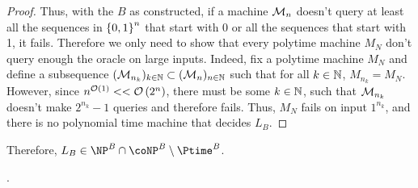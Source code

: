 \begin{proof}
        Thus, with the $B$ as constructed, if a machine $\mathcal{M}_n$ doesn't query 
        at least all the sequences in $\left\{ 0, 1 \right\}^n$ that start with 0
        or all the sequences that start with 1,
        it fails.
        Therefore we only need to show that every polytime machine $M_N$
        don't query enough the oracle on large inputs.
        Indeed, fix a polytime machine $M_N$
        and define a subsequence
        $(\mathcal{M}_{n_k})_{k \in \mathbb N} \subset (\mathcal{M}_n)_{n \in \mathbb N}$ 
        such that for all $k \in \mathbb N$, $M_{n_k} = M_N$.
        However, since $n^{\mathcal{O}\left(1\right)} << \mathcal{O}\left(2^n\right)$, there must be some $k \in \mathbb N$,
        such that $\mathcal{M}_{n_k}$ doesn't make $2^{n_k} - 1$ queries and therefore fails.
        Thus, $M_N$ fails on input $1^{n_k}$, and there is no polynomial time
        machine that decides $L_B$.
    \end{proof}

    Therefore, $L_B \in \NP^B \cap \coNP^B \setminus \Ptime^B$.


    \newpage
    .

